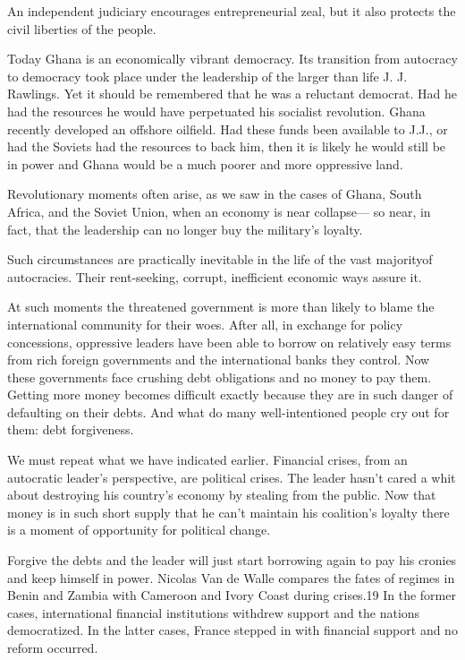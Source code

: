 \documentclass[10pt]{article}
\begin{document}
{\large An independent judiciary encourages entrepreneurial zeal, but it also
protects the civil liberties of the people.}

{\large Today Ghana is an economically vibrant democracy. Its transition from
autocracy to democracy took place under the leadership of the larger than life J.
J. Rawlings. Yet it should be remembered that he was a reluctant democrat. Had he
had the resources he would have perpetuated his socialist revolution. Ghana
recently developed an offshore oilfield. Had these funds been available to J.J.,
or had the Soviets had the resources to back him, then it is likely he would
still be in power and Ghana would be a much poorer and more oppressive land.}

{\large Revolutionary moments often arise, as we saw in the cases of Ghana,
South Africa, and the Soviet Union, when an economy is near collapse--- so near,
in fact, that the leadership can no longer buy the military's loyalty.}

{\large Such circumstances are practically inevitable in the life of the vast
majorityof autocracies. Their rent-seeking, corrupt, inefficient economic ways
assure it.}

{\large At such moments the threatened government is more than likely to blame
the international community for their woes. After all, in exchange for policy
concessions, oppressive leaders have been able to borrow on relatively easy terms
from rich foreign governments and the international banks they control. Now these
governments face crushing debt obligations and no money to pay them. Getting more
money becomes difficult exactly because they are in such danger of defaulting on
their debts. And what do many well-intentioned people cry out for them: debt
forgiveness.}

{\large We must repeat what we have indicated earlier. Financial crises, from an
autocratic leader's perspective, are political crises. The leader hasn't cared a
whit about destroying his country's economy by stealing from the public. Now that
money is in such short supply that he can't maintain his coalition's loyalty
there is a moment of opportunity for political change.}

{\large Forgive the debts and the leader will just start borrowing again to pay
his cronies and keep himself in power. Nicolas Van de Walle compares the fates of
regimes in Benin and Zambia with Cameroon and Ivory Coast during crises.19 In the
former cases, international financial institutions withdrew support and the
nations democratized. In the latter cases, France stepped in with financial
support and no reform occurred.}
\end{document}
